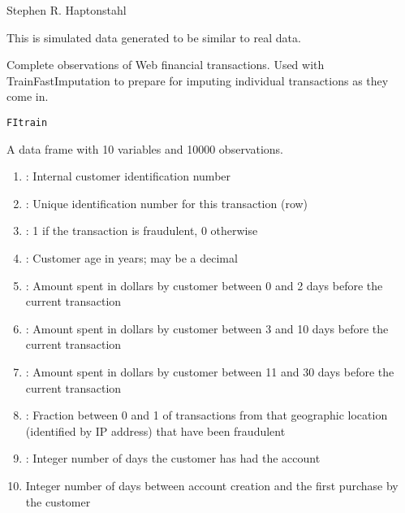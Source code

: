 \documentclass[a4paper]{book}
\begin{document}
%
\begin{Author}\relax
Stephen R. Haptonstahl 
\end{Author}
%
\begin{Source}\relax
This is simulated data generated to be similar to real data.
\end{Source}
%
\begin{Description}\relax
Complete observations of Web financial transactions.  
Used with TrainFastImputation to prepare for imputing individual
transactions as they come in.
\end{Description}
%
\begin{Usage}
\begin{verbatim}
FItrain
\end{verbatim}
\end{Usage}
%
\begin{Format}
 A data frame with 10 variables and 10000 observations. \begin{enumerate}

\item {}: Internal customer identification number
\item {}: Unique identification number for this transaction (row)
\item {}: 1 if the transaction is fraudulent, 0 otherwise
\item {}: Customer age in years; may be a decimal
\item {}: Amount spent in dollars by customer between 0 and 2 days before the current transaction
\item {}: Amount spent in dollars by customer between 3 and 10 days before the current transaction
\item {}: Amount spent in dollars by customer between 11 and 30 days before the current transaction
\item {}: Fraction between 0 and 1 of transactions from that geographic location (identified by IP address) that have been fraudulent
\item {}: Integer number of days the customer has had the account
\item {} Integer number of days between account creation and the first purchase by the customer

\end{enumerate}
\end{Format}
\end{document}
